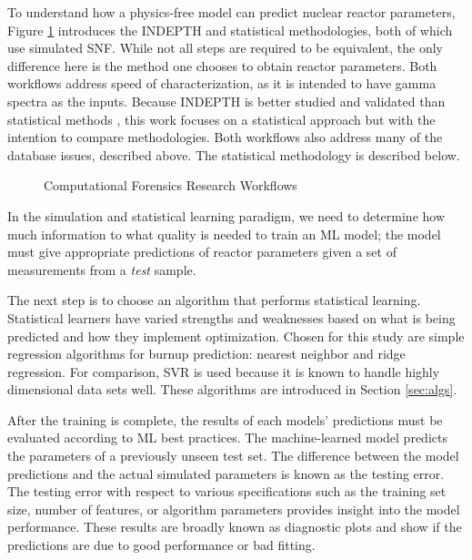 To understand how a physics-free model can predict nuclear reactor parameters,
Figure \ref{fig:compworkflow} introduces the \gls{INDEPTH} and statistical
methodologies, both of which use simulated \gls{SNF}.  While not all steps are
required to be equivalent, the only difference here is the method one chooses
to obtain reactor parameters. Both workflows address speed of characterization,
as it is intended to have gamma spectra as the inputs.  Because \gls{INDEPTH}
is better studied and validated than statistical methods \cite{weber_2006,
weber_2011, weber_2010}, this work focuses on a statistical approach but with
the intention to compare methodologies.  Both workflows also address many of
the database issues, described above. The statistical methodology is described
below.
\\
\begin{figure}[!tbh]
  \caption{Computational Forensics Research Workflows}
  \label{fig:compworkflow}
\end{figure}

In the simulation and statistical learning paradigm, we need to determine how
much information to what quality is needed to train an \gls{ML} model;
the model must give appropriate predictions of reactor parameters given a set
of measurements from a \textit{test} sample. 

The next step is to choose an algorithm that performs statistical learning.
Statistical learners have varied strengths and weaknesses based on what is
being predicted and how they implement optimization.  Chosen for this study are
simple regression algorithms for burnup prediction: nearest neighbor and ridge
regression.  For comparison, \acrfull{SVR} is used because it is known to handle
highly dimensional data sets well.  These algorithms are introduced in Section
\ref{sec:algs}.

After the training is complete, the results of each models' predictions must be
evaluated according to \gls{ML} best practices.  The machine-learned
model predicts the parameters of a previously unseen test set.  The difference
between the model predictions and the actual simulated parameters is known as
the testing error.  The testing error with respect to various specifications
such as the training set size, number of features, or algorithm parameters
provides insight into the model performance. These results are broadly known as
diagnostic plots and show if the predictions are due to good performance or bad
fitting. 

